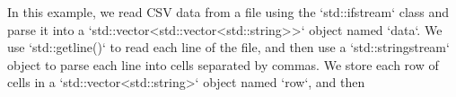 In this example, we read CSV data from a file using the `std::ifstream` class and parse it into a `std::vector<std::vector<std::string>>` object named `data`. We use `std::getline()` to read each line of the file, and then use a `std::stringstream` object to parse each line into cells separated by commas. We store each row of cells in a `std::vector<std::string>` object named `row`, and then

